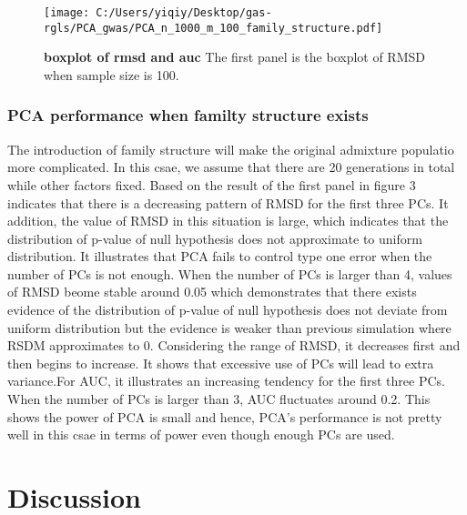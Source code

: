 \documentclass[12pt]{article}
\begin{document}
\begin{figure}[bp!]
  \centering
  \texttt{[image: C:/Users/yiqiy/Desktop/gas-rgls/PCA\_gwas/PCA\_n\_1000\_m\_100\_family\_structure.pdf]}
  \caption{
    {\bf boxplot of rmsd and auc}
    The first panel is the boxplot of RMSD when sample size is 100.}
  \label{fig:example}
\end{figure}

\subsubsection{PCA performance when familty structure exists}

The introduction of family structure will make the original admixture populatio more complicated. In this csae, we assume that there are 20 generations in total while other factors fixed. Based on the result of the first panel in figure 3 indicates that there is a decreasing pattern of RMSD for the first three PCs. It addition, the value of RMSD in this situation is large, which indicates that the distribution of p-value of null hypothesis does not approximate to uniform distribution. It illustrates that PCA fails to control type one error when the number of PCs is not enough. When the number of PCs is larger than 4, values of RMSD beome stable around 0.05 which demonstrates that there exists evidence of the distribution of p-value of null hypothesis does not deviate from uniform distribution but the evidence is weaker than previous simulation where RSDM approximates to 0. Considering the range of RMSD, it decreases first and then begins to increase. It shows that excessive use of PCs will lead to extra variance.For AUC, it illustrates an increasing tendency for the first three PCs. When the number of PCs is larger than 3, AUC fluctuates around 0.2. This shows the power of PCA is small and hence, PCA's performance is not pretty well in this csae in terms of power even though enough PCs are used. 


\section{Discussion}
\end{document}
